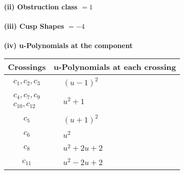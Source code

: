\documentclass[1p]{elsarticle_modified}
\theoremstyle{definition}
\begin{document}
\flushleft \textbf{(ii) Obstruction class $= 1$}\\~\\
\flushleft \textbf{(iii) Cusp Shapes $= -4$}\\~\\
\newpage\renewcommand{\arraystretch}{1}
\flushleft \textbf{(iv) u-Polynomials at the component}\newline \\
\begin{tabular}{m{50pt}|m{274pt}}
Crossings & \hspace{64pt}u-Polynomials at each crossing \\
\hline $$\begin{aligned}c_{1},c_{2},c_{3}\end{aligned}$$&$\begin{aligned}
&(u-1)^2
\end{aligned}$\\
\hline $$\begin{aligned}c_{4},c_{7},c_{9}\\c_{10},c_{12}\end{aligned}$$&$\begin{aligned}
&u^2+1
\end{aligned}$\\
\hline $$\begin{aligned}c_{5}\end{aligned}$$&$\begin{aligned}
&(u+1)^2
\end{aligned}$\\
\hline $$\begin{aligned}c_{6}\end{aligned}$$&$\begin{aligned}
&u^2
\end{aligned}$\\
\hline $$\begin{aligned}c_{8}\end{aligned}$$&$\begin{aligned}
&u^2+2 u+2
\end{aligned}$\\
\hline $$\begin{aligned}c_{11}\end{aligned}$$&$\begin{aligned}
&u^2-2 u+2
\end{aligned}$\\
\hline
\end{tabular}\\~\\
\end{document}
